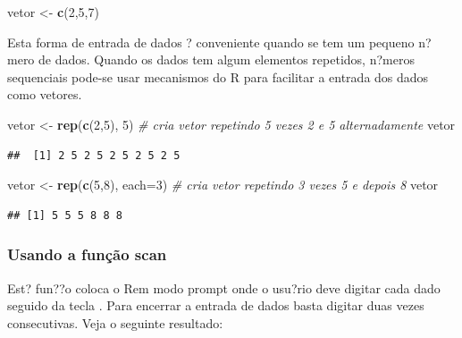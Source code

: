 \documentclass[]{book}
\newenvironment{Shaded}{\begin{snugshade}}{\end{snugshade}}
\newcommand{\CommentTok}[1]{\textcolor[rgb]{0.56,0.35,0.01}{\textit{#1}}}
\newcommand{\DataTypeTok}[1]{\textcolor[rgb]{0.13,0.29,0.53}{#1}}
\newcommand{\DecValTok}[1]{\textcolor[rgb]{0.00,0.00,0.81}{#1}}
\newcommand{\KeywordTok}[1]{\textcolor[rgb]{0.13,0.29,0.53}{\textbf{#1}}}
\newcommand{\NormalTok}[1]{#1}
\newcommand{\StringTok}[1]{\textcolor[rgb]{0.31,0.60,0.02}{#1}}
\begin{document}
\begin{Shaded}
\begin{Highlighting}[]
\NormalTok{vetor <-}\StringTok{ }\KeywordTok{c}\NormalTok{(}\DecValTok{2}\NormalTok{,}\DecValTok{5}\NormalTok{,}\DecValTok{7}\NormalTok{)}
\end{Highlighting}
\end{Shaded}

Esta forma de entrada de dados ? conveniente quando se tem um pequeno n?mero de dados. Quando os dados tem algum elementos repetidos, n?meros sequenciais pode-se usar mecanismos do R para facilitar a entrada dos dados como vetores.

\begin{Shaded}
\begin{Highlighting}[]
\NormalTok{vetor <-}\StringTok{ }\KeywordTok{rep}\NormalTok{(}\KeywordTok{c}\NormalTok{(}\DecValTok{2}\NormalTok{,}\DecValTok{5}\NormalTok{), }\DecValTok{5}\NormalTok{)  }\CommentTok{# cria vetor repetindo 5 vezes 2 e 5 alternadamente}
\NormalTok{vetor}
\end{Highlighting}
\end{Shaded}

\begin{verbatim}
##  [1] 2 5 2 5 2 5 2 5 2 5
\end{verbatim}

\begin{Shaded}
\begin{Highlighting}[]
\NormalTok{vetor <-}\StringTok{ }\KeywordTok{rep}\NormalTok{(}\KeywordTok{c}\NormalTok{(}\DecValTok{5}\NormalTok{,}\DecValTok{8}\NormalTok{), }\DataTypeTok{each=}\DecValTok{3}\NormalTok{)  }\CommentTok{# cria vetor repetindo 3 vezes 5 e depois 8}
\NormalTok{vetor}
\end{Highlighting}
\end{Shaded}

\begin{verbatim}
## [1] 5 5 5 8 8 8
\end{verbatim}

\hypertarget{usando-a-funcao-scan}{%
\subsubsection{Usando a função scan}\label{usando-a-funcao-scan}}

Est? fun??o coloca o Rem modo prompt onde o usu?rio deve digitar cada dado seguido da tecla . Para encerrar a entrada de dados basta digitar duas vezes consecutivas. Veja o seguinte resultado:
\end{document}
